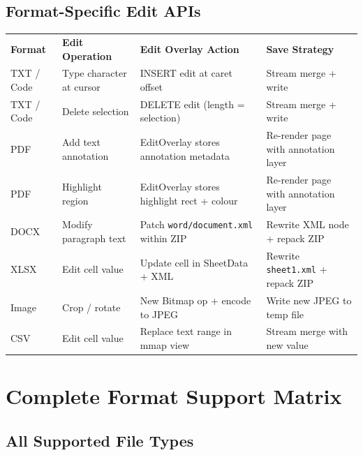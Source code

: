 \documentclass[12pt,a4paper]{report}
\newcommand{\ra}[1]{\renewcommand{\arraystretch}{#1}}
\newcommand{\TH}[1]{\rowcolor{P1}\color{white}\bfseries #1}
\newcommand{\PB}{\newpage}
\begin{document}
\section{Format-Specific Edit APIs}

\begin{center}\ra{1.35}
\begin{tabular}{L{2.0cm} L{4.6cm} L{3.6cm} L{3.6cm}}
\TH{Format} & \TH{Edit Operation} & \TH{Edit Overlay Action} & \TH{Save Strategy} \\
 TXT / Code & Type character at cursor & INSERT edit at caret offset & Stream merge + write \\
 TXT / Code & Delete selection & DELETE edit (length = selection) & Stream merge + write \\
 PDF & Add text annotation & EditOverlay stores annotation metadata & Re-render page with annotation layer \\
 PDF & Highlight region & EditOverlay stores highlight rect + colour & Re-render page with annotation layer \\
 DOCX & Modify paragraph text & Patch \texttt{word/document.xml} within ZIP & Rewrite XML node + repack ZIP \\
 XLSX & Edit cell value & Update cell in SheetData + XML & Rewrite \texttt{sheet1.xml} + repack ZIP \\
 Image & Crop / rotate & New Bitmap op + encode to JPEG & Write new JPEG to temp file \\
 CSV & Edit cell value & Replace text range in mmap view & Stream merge with new value \\
\end{tabular}
\end{center}

\PB

\chapter{Complete Format Support Matrix}

\section{All Supported File Types}
\end{document}
